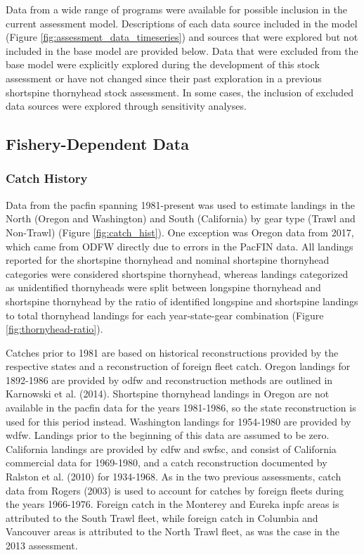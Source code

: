 \documentclass[11pt,
  english,
  letterpaper,
]{article}
\begin{document}
Data from a wide range of programs were available for possible inclusion in the current assessment model. Descriptions of each data source included in the model (Figure \ref{fig:assessment_data_timeseries}) and sources that were explored but not included in the base model are provided below. Data that were excluded from the base model were explicitly explored during the development of this stock assessment or have not changed since their past exploration in a previous shortspine thornyhead stock assessment. In some cases, the inclusion of excluded data sources were explored through sensitivity analyses.

\hypertarget{fishery-dependent-data}{%
\subsection{Fishery-Dependent Data}\label{fishery-dependent-data}}

\hypertarget{catch-history}{%
\subsubsection{Catch History}\label{catch-history}}

Data from the \Gls{pacfin} spanning 1981-present was used to estimate landings in the North (Oregon and Washington) and South (California) by gear type (Trawl and Non-Trawl) (Figure \ref{fig:catch_hist}). One exception was Oregon data from 2017, which came from ODFW directly due to errors in the PacFIN data. All landings reported for the shortspine thornyhead and nominal shortspine thornyhead categories were considered shortspine thornyhead, whereas landings categorized as unidentified thornyheads were split between longspine thornyhead and shortspine thornyhead by the ratio of identified longspine and shortspine landings to total thornyhead landings for each year-state-gear combination (Figure \ref{fig:thornyhead-ratio}).

Catches prior to 1981 are based on historical reconstructions provided by the respective states and a reconstruction of foreign fleet catch. Oregon landings for 1892-1986 are provided by \gls{odfw} and reconstruction methods are outlined in Karnowski et al. (2014). Shortspine thornyhead landings in Oregon are not available in the \gls{pacfin} data for the years 1981-1986, so the state reconstruction is used for this period instead. Washington landings for 1954-1980 are provided by \gls{wdfw}. Landings prior to the beginning of this data are assumed to be zero. California landings are provided by \gls{cdfw} and \gls{swfsc}, and consist of California commercial data for 1969-1980, and a catch reconstruction documented by Ralston et al. (2010) for 1934-1968. As in the two previous assessments, catch data from Rogers (2003) is used to account for catches by foreign fleets during the years 1966-1976. Foreign catch in the Monterey and Eureka \gls{inpfc} areas is attributed to the South Trawl fleet, while foreign catch in Columbia and Vancouver areas is attributed to the North Trawl fleet, as was the case in the 2013 assessment.
\end{document}

